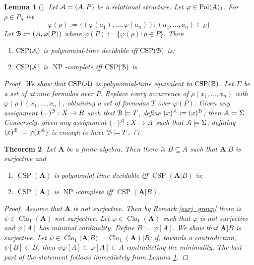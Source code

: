 \documentclass{amsart}
\theoremstyle{plain}
\newtheorem{theorem}{Theorem}[section]
\newtheorem{lemma}[theorem]{Lemma}
\theoremstyle{definition}
\theoremstyle{remark}
\def\phi{\varphi}
\DeclareMathOperator{\Clo}{Clo}
\DeclareMathOperator{\CSP}{CSP}
\DeclareMathOperator{\Pol}{Pol}
\DeclareMathOperator{\NP}{NP}
\begin{document}
\begin{lemma}[\cite{jeavons}]
    \label{image}
    Let $\EuScript{A}=(A, P)$ be a relational structure. 
    Let $\phi \in \Pol(\EuScript{A})_1$. 
    For $\rho \in P_n$ let 
    \begin{equation*}
        \phi(\rho):=\{(\phi(a_1), \ldots, \phi(a_n)):(a_1, \ldots, a_n) \in \rho\}
    \end{equation*}
    Let $\EuScript{B}:=(A, \phi(P))$ where $\phi(P):=\{\phi(\rho): \rho \in P\}$.
    Then 
    \begin{enumerate}
        \item $\CSP(\EuScript{A})$ is polynomial-time decidable iff $\CSP(\EuScript{B})$ is; 
        \item $\CSP(\EuScript{A})$ is $\NP$-complete iff $\CSP(\EuScript{B})$ is. 
    \end{enumerate}
    \begin{proof}
        We show that $\CSP(\EuScript{A})$ is polynomial-time equivalent to $\CSP(\EuScript{B})$. 
        Let $\Sigma$ be a set of atomic formulas over $P$. 
        Replace every occurrence of $\rho(x_1, \ldots, x_n)$ with $\phi(\rho)(x_1, \ldots, x_n)$, 
        obtaining a set of formulas $T$ over $\phi(P)$. 
        Given any assignment $(-)^{\EuScript{B}}: X \to B$ such that $\EuScript{B} \models T$, 
        define $(x)^{\EuScript{A}}:=(x)^{\EuScript{B}}$; then $\EuScript{A} \models \Sigma$. 
        Conversely, given any assignment $(-)^{\EuScript{A}}: X \to A$ such that $\EuScript{A} \models \Sigma$,
        defining $(x)^{\EuScript{B}}:=\phi(x^{\EuScript{A}})$ is enough to have $\EuScript{B} \models T$.  
    \end{proof}
\end{lemma}

\begin{theorem}
    Let $\mathbf{A}$ be a finite algebra. 
    Then there is $B \subseteq A$ such that $\mathbf{A}|B$ is surjective and 
    \begin{enumerate}
        \item $\CSP(\mathbf{A})$ is polynomial-time decidable iff $\CSP(\mathbf{A}|B)$ is; 
        \item $\CSP(\mathbf{A})$ is $\NP$-complete iff $\CSP(\mathbf{A}|B)$.
    \end{enumerate}
    \begin{proof}
        Assume that $\mathbf{A}$ is not surjective. 
        Then by Remark \ref{surj_group} there is $\psi \in \Clo_1(\mathbf{A})$ not surjective. 
        Let $\phi \in \Clo_1(\mathbf{A})$ such that $\phi$ is not surjective and $\phi[A]$ has minimal cardinality. 
        Define $B:=\phi[A]$. 
        We show that $\mathbf{A}|B$ is surjective. 
        Let $\psi \in \Clo_1(\mathbf{A}|B) = \Clo_1(\mathbf{A})|B $;
        if, towards a contradiction, $\psi[B] \subset B$, then $\psi \phi [A] \subset \phi[A] \subset A$ contradicting the minimality. 
        The last part of the statement follows immediately from Lemma \ref{image}. 
    \end{proof}
\end{theorem}
\end{document}
